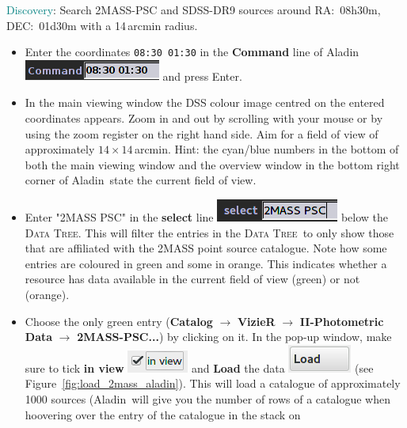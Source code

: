 \documentclass [a4paper, 12pt]{article}
\newcommand{\aladin}{{\textsc{A}{ladin}}}
\newcommand{\datatree}{\textsc{Data Tree}}
\begin{document}
\noindent \textcolor{teal}{Discovery}: Search 2MASS-PSC and SDSS-DR9 sources 
around RA:~08h30m, DEC:~01d30m with a 14\,arcmin radius.
\begin{itemize}
    \item Enter the coordinates \texttt{08:30 01:30} in the \textbf{Command} 
    line of \aladin\ \includegraphics[width=0.2 
    \textwidth]{../images/aladin_command_coordinates.png} and press Enter.
    \item In the main viewing window the DSS colour image centred on the 
    entered coordinates appears. Zoom in and out by scrolling with your mouse 
    or by using the zoom register on the right hand side. Aim for a field of 
    view of approximately $14\times14$\,arcmin. Hint: the 
    cyan/blue numbers in the bottom of both the main viewing window and the 
    overview window in the bottom right corner of \aladin\ state the current 
    field of view. 
    \item Enter "2MASS PSC" in the \textbf{select} line 
    \includegraphics[width=0.17 
    \textwidth]{../images/aladin_select_2mass_psc.png} below the \datatree. 
    This will filter the entries in the \datatree\ to only show those that are 
    affiliated with the 2MASS point source catalogue. Note how some entries are 
    coloured in green and some in orange. This indicates whether a resource 
    has data available in the current field of view (green) or not (orange). 
    \item Choose the only green entry (\textbf{Catalog} $\rightarrow$ 
    \textbf{VizieR} $\rightarrow$ \textbf{II-Photometric Data} $\rightarrow$ 
    \textbf{2MASS-PSC...}) by clicking on it. In the pop-up window, make sure 
    to tick \textbf{in view} \includegraphics[width=0.1 
    \textwidth]{../images/aladin_load_inview.png} and \textbf{Load} the data 
    \includegraphics[width=0.1 
    \textwidth]{../images/aladin_load_load.png} (see 
    Figure~\ref{fig:load_2mass_aladin}). This will load a catalogue of 
    approximately 1000 sources (\aladin\ will give you the number of rows of a 
    catalogue when hoovering over the entry of the catalogue in the stack on 

\end{itemize}
\end{document}
